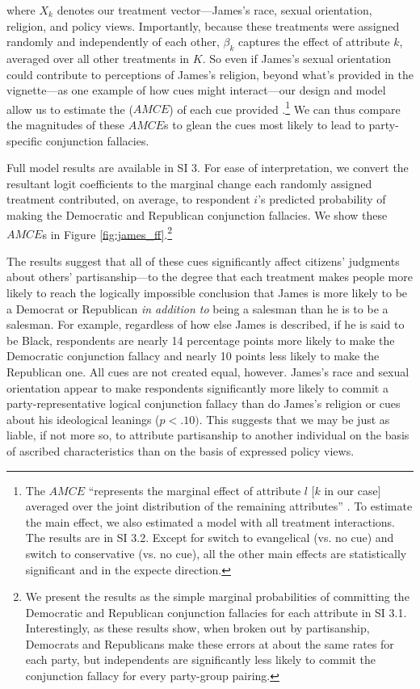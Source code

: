 \documentclass[12pt, letterpaper]{article}
\begin{document}
\noindent where $X_{k}$ denotes our treatment vector---James's race, sexual orientation, religion, and policy views. Importantly, because these treatments were assigned randomly and independently of each other, $\beta_{k}$ captures the effect of attribute $k$, averaged over all other treatments in $K$. So even if James's sexual orientation could contribute to perceptions of James's religion, beyond what's provided in the vignette---as one example of how cues might interact---our design and model allow us to estimate the ($AMCE$) of each cue provided \citep{hainmueller2013causal}.\footnote{The $AMCE$ ``represents the marginal effect of attribute $l$ [$k$ in our case] averaged over the joint distribution of the remaining attributes'' \citep{hainmueller2013causal}. To estimate the main effect, we also estimated a model with all treatment interactions. The results are in SI 3.2. Except for switch to evangelical (vs. no cue) and switch to conservative (vs. no cue), all the other main effects are statistically significant and in the expecte direction.} We can thus compare the magnitudes of these $AMCE$s to glean the cues most likely to lead to party-specific conjunction fallacies.

Full model results are available in SI 3. For ease of interpretation, we convert the resultant logit coefficients to the marginal change each randomly assigned treatment contributed, on average, to respondent $i$'s predicted probability of making the Democratic and Republican conjunction fallacies. We show these $AMCE$s in Figure \ref{fig:james_ff}.\footnote{We present the results as the simple marginal probabilities of committing the Democratic and Republican conjunction fallacies for each attribute in SI 3.1. Interestingly, as these results show, when broken out by partisanship, Democrats and Republicans make these errors at about the same rates for each party, but independents are significantly less likely to commit the conjunction fallacy for every party-group pairing.} 

The results suggest that all of these cues significantly affect citizens' judgments about others' partisanship---to the degree that each treatment makes people more likely to reach the logically impossible conclusion that James is more likely to be a Democrat or Republican \emph{in addition to} being a salesman than he is to be a salesman. For example, regardless of how else James is described, if he is said to be Black, respondents are nearly 14 percentage points more likely to make the Democratic conjunction fallacy and nearly 10 points less likely to make the Republican one. All cues are not created equal, however. James's race and sexual orientation appear to make respondents significantly more likely to commit a party-representative logical conjunction fallacy than do James's religion or cues about his ideological leanings ($p < .10)$. This suggests that we may be just as liable, if not more so, to attribute partisanship to another individual on the basis of ascribed characteristics than on the basis of expressed policy views. 
\end{document}
